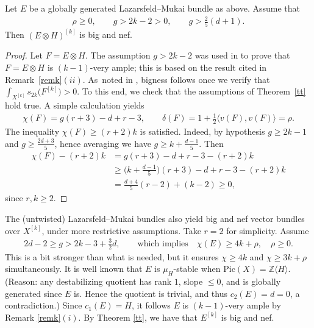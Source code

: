 \documentclass[10pt,a4paper]{amsart}
\numberwithin{equation}{section}
\begin{document}
\begin{Example}%
Let $E$ be a globally generated Lazarsfeld--Mukai bundle as above. Assume that
\begin{gather*}
\rho\geq 0, \qquad g>2k-2>0, \qquad g> \frac{2}{5}(d+1).
\end{gather*}
Then $(E\otimes H)^{[k]}$ is big and nef.
\end{Example}

\begin{proof}
Let $F=E\otimes H$. The assumption $g>2k-2$ was used in \cite[Theorem~5.5]{BBF} to prove that $F=E\otimes H$ is $(k-1)$-very ample; this is based on the result cited in Remark~\ref{remk}$(ii)$. As~noted in \cite{BBF}, bigness follows once we verify that $\int_{X^{[k]}} s_{2k}\big(F^{[k]}\big)>0$. To this end, we check that the assumptions of Theorem~\ref{tt} hold true. A simple calculation yields
\begin{gather*}
\chi(F)=g(r+3) -d +r-3,\qquad \delta(F)=1+\frac{1}{2} \langle v(F), v(F)\rangle=\rho.
\end{gather*}
The inequality $\chi(F)\geq (r+2)k$ is satisfied.
Indeed, by hypothesis $g\geq 2k-1$ and $g\geq \frac{2d+3}{5}$, hence averaging we have $g\geq k+\frac{d-1}{5}$. Then
\begin{align*}
\chi(F)-(r+2)k&=g(r+3)-d+r-3-(r+2)k
\\
&\geq \biggl(k+\frac{d-1}{5}\biggr)(r+3)-d+r-3-(r+2)k
\\
&=\frac{d+4}{5}(r-2)+(k-2)\geq 0,
\end{align*}
since $r, k\geq 2$.
\end{proof}

\begin{Example} The (untwisted) Lazarsfeld--Mukai bundles also yield big and nef vector bundles over $X^{[k]}$, under more restrictive assumptions. Take $r=2$ for simplicity. Assume
\begin{gather*}
2d-2\geq g> 2k-3+ \frac{3}{2}d,\qquad \text{which implies} \quad \chi(E)\geq 4k+\rho, \quad \rho\geq 0.
\end{gather*}
This is a bit stronger than what is needed, but it ensures $\chi\geq 4k$ and $\chi\geq 3k+\rho$ simultaneously. It is well known that $E$ is $\mu_H$-stable when $\text{Pic}(X)=\mathbb Z\langle H\rangle$. (Reason: any destabilizing quotient has rank $1$, slope $\leq 0$, and is globally generated since $E$ is. Hence the quotient is trivial, and thus $c_2(E)=d=0$, a contradiction.) Since $c_1(E)=H$, it follows $E$ is $(k-1)$-very ample by Remark \ref{remk}$(i)$. By Theorem \ref{tt}, we have that $E^{[k]}$ is big and nef.
\end{Example}
\end{document}
